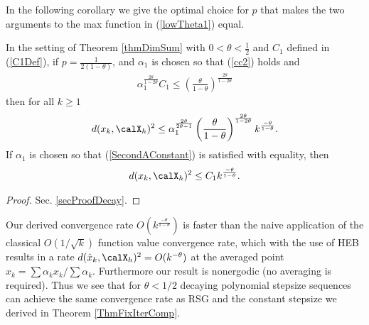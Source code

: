 
In the following corollary we give the optimal choice for $p$ that makes the two arguments to the max function in (\ref{lowTheta1}) equal. 
\begin{corollary}\label{CorDimSum}
In the setting of Theorem \ref{thmDimSum} with $0<\theta<\frac{1}{2}$ and $C_1$ defined in (\ref{C1Def}),  if $p=\frac{1}{2(1-\theta)}$, and $\alpha_1$ is chosen so that (\ref{cc2}) holds and
\begin{eqnarray}\label{SecondAConstant}
\alpha_1^{\frac{2\theta}{1-2\theta}}
C_1\leq \left(\frac{\theta}{1-\theta}\right)^{\frac{2\theta}{1-2\theta}}
\end{eqnarray}
then for all $k\geq 1$
\begin{eqnarray*}\label{lowTheta2}
d(x_k,\calX_h)^2\leq 
\alpha_1^{\frac{2\theta}{2\theta-1}}
\left(\frac{\theta}{1-\theta}\right)^{\frac{2\theta}{1-2\theta}} 
k^{\frac{-\theta}{1-\theta}}. 
\end{eqnarray*}
If $\alpha_1$ is chosen so that (\ref{SecondAConstant}) is satisfied with equality, then 
\begin{eqnarray*}\label{lowTheta3}
d(x_k,\calX_h)^2\leq 
C_1
k^{\frac{-\theta}{1-\theta}}. 
\end{eqnarray*}

\end{corollary}
\begin{proof}
Sec. \ref{secProofDecay}.
\end{proof}

Our derived convergence rate $O(k^{\frac{-\theta}{1-\theta}})$ is faster than the naive application of the classical $O(1/\sqrt{k})$ function value convergence rate, which with the use of HEB results in a rate $d(\hat{x}_k,\calX_h)^2=O(k^{-\theta})$ at the averaged point $\hat{x}_k=\sum\alpha_k x_k/\sum\alpha_k$. Furthermore our result is nonergodic (no averaging is required). 
Thus we see that for $\theta<1/2$ decaying polynomial stepsize sequences can achieve the same convergence rate as RSG \cite{yang2015rsg} and the constant stepsize we derived in Theorem \ref{ThmFixIterComp}. %



